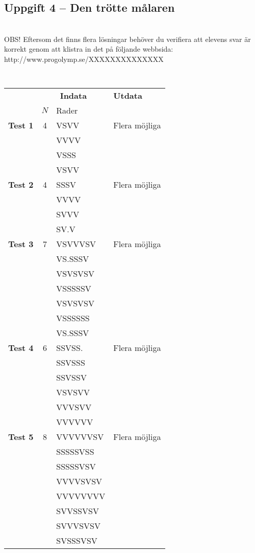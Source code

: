\documentclass[a4paper,12pt,oneside]{amsbook}
\theoremstyle{test}
\newcommand{\fe}[1]{\textbf{#1}}            %
\begin{document}
\subsection*{Uppgift 4 -- Den trötte målaren}
~\\
OBS! Eftersom det finns flera lösningar behöver du verifiera att
elevens svar är korrekt genom att klistra in det på följande webbsida: \\
http://www.progolymp.se/XXXXXXXXXXXXXX
~\\
{\tt 
\begin{tabular}{||l||c|l||l||}\hline\hline
& \multicolumn{2}{c||}{\fe{Indata}} & \fe{Utdata} \\
& $N$ & Rader & \\ \hline \hline
\fe{Test 1} &4&VSVV & Flera möjliga \\
&&VVVV&\\
&&VSSS&\\
&&VSVV&\\\hline
\fe{Test 2} &4&SSSV & Flera möjliga \\
&&VVVV&\\
&&SVVV&\\
&&SV.V&\\\hline
\fe{Test 3} &7&VSVVVSV & Flera möjliga \\
&&VS.SSSV&\\
&&VSVSVSV&\\
&&VSSSSSV&\\
&&VSVSVSV&\\
&&VSSSSSS&\\
&&VS.SSSV&\\\hline
\fe{Test 4} &6&SSVSS. & Flera möjliga \\
&&SSVSSS&\\
&&SSVSSV&\\
&&VSVSVV&\\
&&VVVSVV&\\
&&VVVVVV&\\\hline
\fe{Test 5} &8&VVVVVVSV & Flera möjliga \\
&&SSSSSVSS&\\
&&SSSSSVSV&\\
&&VVVVSVSV&\\
&&VVVVVVVV&\\
&&SVVSSVSV&\\
&&SVVVSVSV&\\
&&SVSSSVSV&\\\hline\hline
\end{tabular}
}
\end{document}
